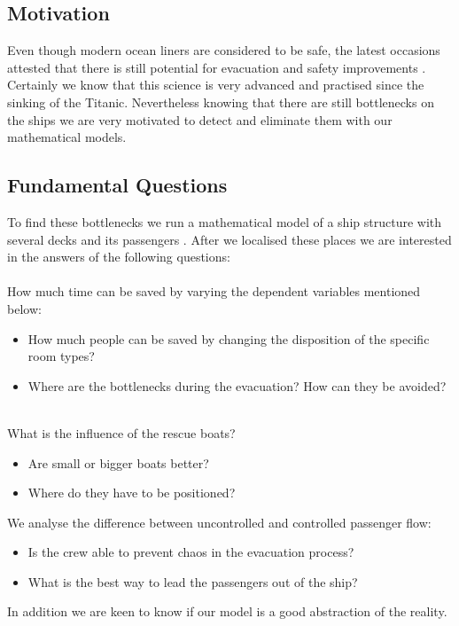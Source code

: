\documentclass[11pt]{article}
\begin{document}
\subsection{Motivation}
Even though modern ocean liners are considered to be safe, the latest occasions attested that there is still potential for evacuation and safety improvements \cite{concordia}. Certainly we know that this science is very advanced and practised since the sinking of the Titanic. Nevertheless knowing that there are still bottlenecks on the ships we are very motivated to detect and eliminate them with our mathematical models.


\subsection{Fundamental Questions}
To find these bottlenecks we run a mathematical model of a ship structure  with several decks and its passengers \cite{shipdecks}. After we localised these places we are interested in the answers of the following questions:\\\\

How much time can be saved by varying the dependent variables mentioned below:
\begin{itemize}
\item How much people can be saved by changing the disposition of the specific room types?
\item Where are the bottlenecks during the evacuation? How can they be avoided?\\\\
\end{itemize}
What is the influence of the rescue boats?
\begin{itemize}
\item Are small or bigger boats better?
\item Where do they have to be positioned?
\end{itemize}
We analyse the difference between uncontrolled and controlled passenger flow:
\begin{itemize}
\item Is the crew able to prevent chaos in the evacuation process?
\item What is the best way to lead the passengers out of the ship?
\end{itemize}
In addition we are keen to know if our model is a good abstraction of the reality.
\end{document}
